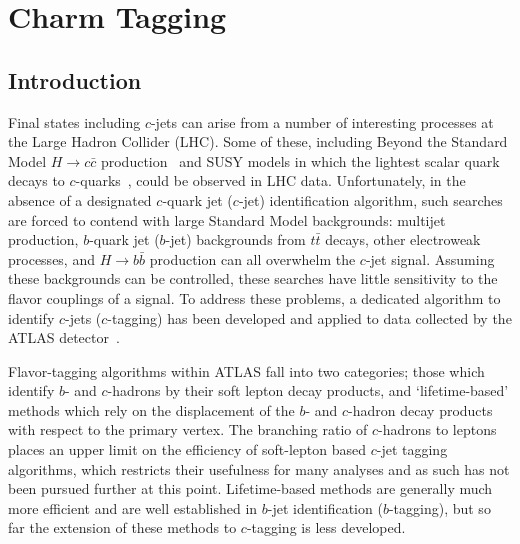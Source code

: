 \chapter{Charm Tagging}

\section{Introduction}
\label{tag:sec:into}

\newcommand{\catpt}{15, 25, 35, 50, 80, 120, 200, $\infty$}
\newcommand{\cateta}{0, 0.7, 1.5, 2.5}
\newcommand{\jfcplotswherefrom}{The jets are from $t \bar{t}$ simulated events generated with \textsc{Powheg+Pythia6}.}
\newcommand{\wherefrom}{The jets are from $t \bar{t}$ simulated events generated with \textsc{Powheg+Pythia6}.}

Final states including $c$-jets can arise from a number of interesting processes at the Large Hadron Collider (LHC).
Some of these, including Beyond the Standard Model $H \to c\bar{c}$ production~\cite{charminghiggs} and SUSY models in which the lightest scalar quark decays to $c$-quarks~\cite{stoptocharm}, could be observed in LHC data.
Unfortunately, in the absence of a designated $c$-quark jet ($c$-jet) identification algorithm, such searches are forced to contend with large Standard Model backgrounds: multijet production, $b$-quark jet ($b$-jet) backgrounds from $t\bar{t}$ decays, other electroweak processes, and $H \to b\bar{b}$ production can all overwhelm the $c$-jet signal.
Assuming these backgrounds can be controlled, these searches have little sensitivity to the flavor couplings of a signal.
To address these problems, a dedicated algorithm to identify $c$-jets ($c$-tagging) has been developed and applied to data collected by the ATLAS detector~\cite{DetPap}.

Flavor-tagging algorithms within ATLAS fall into two categories; those which identify $b$- and $c$-hadrons by their soft lepton decay products, and `lifetime-based' methods which rely on the displacement of the $b$- and $c$-hadron decay products with respect to the primary vertex.
The branching ratio of $c$-hadrons to leptons places an upper limit on the efficiency of soft-lepton based $c$-jet tagging algorithms, which restricts their usefulness for many analyses and as such has not been pursued further at this point.
Lifetime-based methods are generally much more efficient and are well established in $b$-jet identification ($b$-tagging), but so far the extension of these methods to $c$-tagging is less developed.

